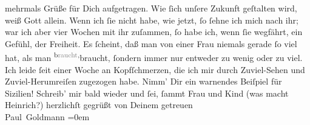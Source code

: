 \begin{ledgroupsized}[t]{13cm}
                   mehrmals Grüße für Dich aufgetragen. Wie
               ſich unſere Zukunft geſtalten wird, weiß Gott allein. Wenn {\pb} ich ſie nicht habe,
               wie jetzt, ſo ſehne ich mich nach ihr; war ich aber vier Wochen mit ihr zuſammen, ſo
               habe ich, wenn ſie wegfährt, ein Gefühl,  der Freiheit. Es ſcheint, daß man von einer Frau niemals gerade ſo viel hat,
               als man \substVorne{}\textsuperscript{b\textcolor{gray}{raucht},}{\allowbreak}\substDazwischen{}braucht,\substHinten{} ſondern immer nur entweder zu wenig oder zu viel.\pend
           \pstart
           Ich leide ſeit einer Woche an Kopfſchmerzen, die ich mir durch Zuviel-Sehen und
               Zuviel-Herumreiſen zugezogen habe. Nimm’ Dir ein warnendes Beiſpiel für Sizilien!\pend
           \pstart
           Schreib’ mir bald wieder und ſei, ſammt Frau und Kind (was macht Heinrich?) herzlichſt
               gegrüßt von Deinem getreuen {\\[\baselineskip]}\spacefill\mbox{Paul Goldmann}\pend
           \leftskip=0em{}
         
         \endnumbering{}\end{ledgroupsized}\begin{anhang}\end{anhang}\newcommand{\dateiname}{L03442}\newcommand{\titel}{Paul Goldmann an Arthur Schnitzler, 8. 4. [1904]}\newcommand{\editorInnen}{Martin Anton Müller und Laura Untner}
      